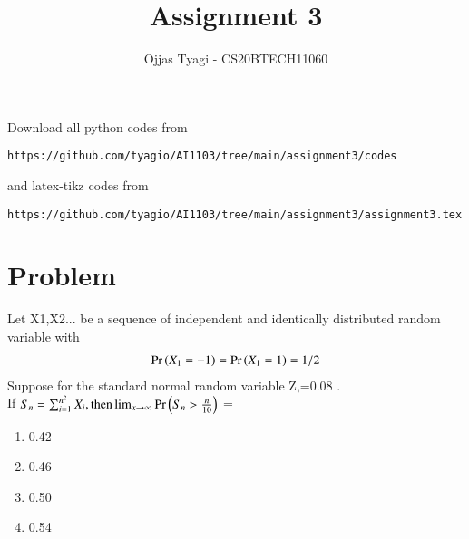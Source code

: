 \documentclass[journal,12pt,twocolumn]{IEEEtran}
\begin{document}
\providecommand{\fourier}{\overset{\mathcal{F}}{ \rightleftharpoons}}
\providecommand{\system}{\overset{\mathcal{H}}{ \longleftrightarrow}}
\newcommand{\solution}{\noindent \textbf{Solution: }}
\newcommand{\cosec}{\,\text{cosec}\,}
\providecommand{\dec}[2]{\ensuremath{\overset{#1}{\underset{#2}{\gtrless}}}}
\newcommand{\myvec}[1]{\ensuremath{\begin{pmatrix}#1\end{pmatrix}}}
\newcommand{\mydet}[1]{\ensuremath{\begin{vmatrix}#1\end{vmatrix}}}
\makeatletter
{}
\makeatother
\let\StandardTheFigure\thefigure
\let\vec\mathbf
\renewcommand{\thefigure}{\theproblem}
\def\putbox#1#2#3{\makebox[0in][l]{\makebox[#1][l]{}\raisebox{\baselineskip}[0in][0in]{\raisebox{#2}[0in][0in]{#3}}}}
     \def\rightbox#1{\makebox[0in][r]{#1}}
     \def\centbox#1{\makebox[0in]{#1}}
     \def\topbox#1{\raisebox{-\baselineskip}[0in][0in]{#1}}
     \def\midbox#1{\raisebox{-0.5\baselineskip}[0in][0in]{#1}}
\vspace{3cm}
\title{Assignment 3}
\author{Ojjas Tyagi - CS20BTECH11060}
\maketitle
\newpage
\bigskip
\renewcommand{\thefigure}{\theenumi}
\renewcommand{\thetable}{\theenumi}
Download all python codes from 
\begin{lstlisting}
https://github.com/tyagio/AI1103/tree/main/assignment3/codes
\end{lstlisting}
%
and latex-tikz codes from 
%
\begin{lstlisting}
https://github.com/tyagio/AI1103/tree/main/assignment3/assignment3.tex
\end{lstlisting}
\section{Problem}
Let X1,X2... be a sequence of independent and identically distributed random variable with
\begin{align}
    \Pr\left(X_1=-1\right)=\Pr\left(X_1=1\right)=1/2
\end{align}
Suppose for the standard normal random variable Z,=0.08 .\\
If \(S_n= \sum_{i=1}^{n^2} X_i ,\text{then} \lim_{x\to\infty} \Pr\left(S_n >\frac{n}{10}\right)\) =
\begin{enumerate}
    \item 0.42
    \item 0.46
    \item 0.50
    \item 0.54
\end{enumerate}
\end{document}
